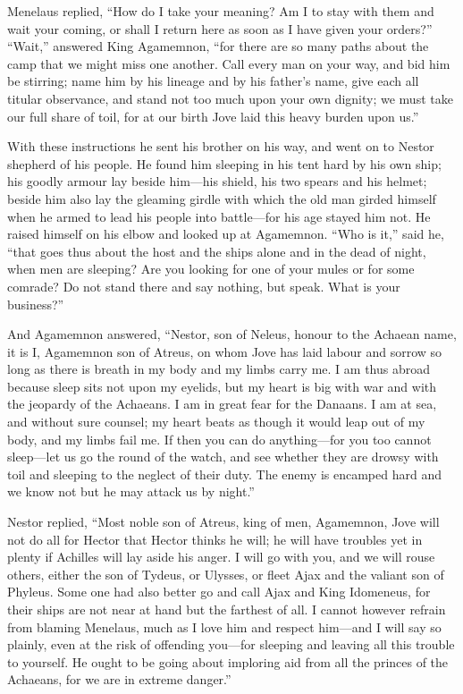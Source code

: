 Menelaus replied, “How do I take your meaning? Am I to stay with them and
wait your coming, or shall I return here as soon as I have given your
orders?” “Wait,” answered King Agamemnon, “for there are so many paths
about the camp that we might miss one another. Call every man on your way,
and bid him be stirring; name him by his lineage and by his father’s name,
give each all titular observance, and stand not too much upon your own
dignity; we must take our full share of toil, for at our birth Jove laid
this heavy burden upon us.”

With these instructions he sent his brother on his way, and went on to
Nestor shepherd of his people. He found him sleeping in his tent hard by
his own ship; his goodly armour lay beside him—his shield, his two
spears and his helmet; beside him also lay the gleaming girdle with which
the old man girded himself when he armed to lead his people into battle—for
his age stayed him not. He raised himself on his elbow and looked up at
Agamemnon. “Who is it,” said he, “that goes thus about the host and the
ships alone and in the dead of night, when men are sleeping? Are you
looking for one of your mules or for some comrade? Do not stand there and
say nothing, but speak. What is your business?”

And Agamemnon answered, “Nestor, son of Neleus, honour to the Achaean
name, it is I, Agamemnon son of Atreus, on whom Jove has laid labour and
sorrow so long as there is breath in my body and my limbs carry me. I am
thus abroad because sleep sits not upon my eyelids, but my heart is big
with war and with the jeopardy of the Achaeans. I am in great fear for the
Danaans. I am at sea, and without sure counsel; my heart beats as though
it would leap out of my body, and my limbs fail me. If then you can do
anything—for you too cannot sleep—let us go the round of the
watch, and see whether they are drowsy with toil and sleeping to the
neglect of their duty. The enemy is encamped hard and we know not but he
may attack us by night.”

Nestor replied, “Most noble son of Atreus, king of men, Agamemnon, Jove
will not do all for Hector that Hector thinks he will; he will have
troubles yet in plenty if Achilles will lay aside his anger. I will go
with you, and we will rouse others, either the son of Tydeus, or Ulysses,
or fleet Ajax and the valiant son of Phyleus. Some one had also better go
and call Ajax and King Idomeneus, for their ships are not near at hand but
the farthest of all. I cannot however refrain from blaming Menelaus, much
as I love him and respect him—and I will say so plainly, even at the
risk of offending you—for sleeping and leaving all this trouble to
yourself. He ought to be going about imploring aid from all the princes of
the Achaeans, for we are in extreme danger.”

